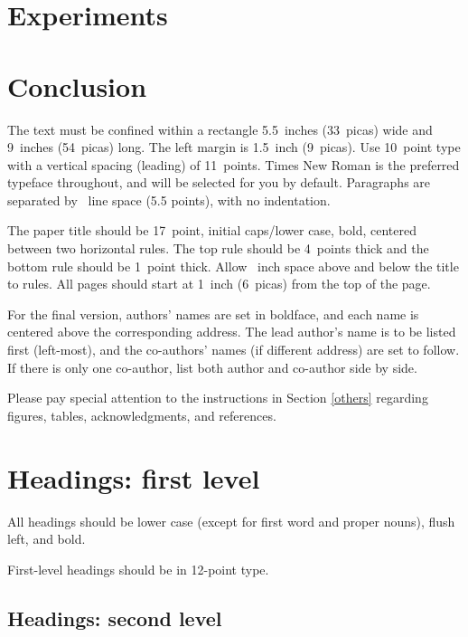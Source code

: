 \documentclass{article}
\begin{document}
\subsection{}

\section{Experiments}

\section{Conclusion}


The text must be confined within a rectangle 5.5~inches (33~picas) wide and
9~inches (54~picas) long. The left margin is 1.5~inch (9~picas).  Use 10~point
type with a vertical spacing (leading) of 11~points.  Times New Roman is the
preferred typeface throughout, and will be selected for you by default.
Paragraphs are separated by ~line space (5.5 points), with no
indentation.


The paper title should be 17~point, initial caps/lower case, bold, centered
between two horizontal rules. The top rule should be 4~points thick and the
bottom rule should be 1~point thick. Allow ~inch space above and
below the title to rules. All pages should start at 1~inch (6~picas) from the
top of the page.


For the final version, authors' names are set in boldface, and each name is
centered above the corresponding address. The lead author's name is to be listed
first (left-most), and the co-authors' names (if different address) are set to
follow. If there is only one co-author, list both author and co-author side by
side.


Please pay special attention to the instructions in Section \ref{others}
regarding figures, tables, acknowledgments, and references.

\section{Headings: first level}
\label{headings}


All headings should be lower case (except for first word and proper nouns),
flush left, and bold.


First-level headings should be in 12-point type.


\subsection{Headings: second level}
\end{document}
